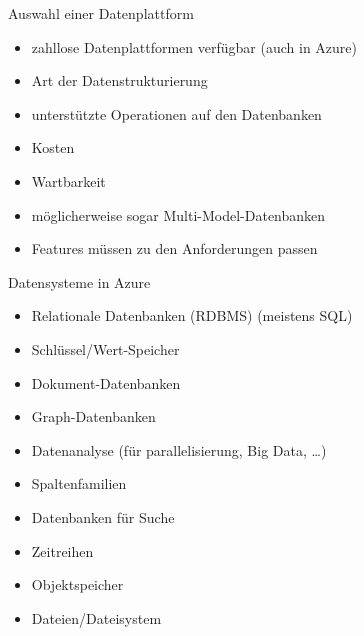 

\begin{flashcard}[Definition]{Auswahl einer Datenplattform}
  \begin{itemize}
    \item zahllose Datenplattformen verfügbar (auch in Azure)
    \item Art der Datenstrukturierung
    \item unterstützte Operationen auf den Datenbanken
    \item Kosten
    \item Wartbarkeit
    \item möglicherweise sogar Multi-Model-Datenbanken
    \item Features müssen zu den Anforderungen passen
  \end{itemize}
\end{flashcard}

\begin{flashcard}[Definition]{Datensysteme in Azure}
  \begin{itemize}
    \item Relationale Datenbanken (RDBMS) (meistens SQL)
    \item Schlüssel/Wert-Speicher
    \item Dokument-Datenbanken
    \item Graph-Datenbanken
    \item Datenanalyse (für parallelisierung, Big Data, \ldots)
    \item Spaltenfamilien
    \item Datenbanken für Suche
    \item Zeitreihen
    \item Objektspeicher
    \item Dateien/Dateisystem
  \end{itemize}
\end{flashcard}

